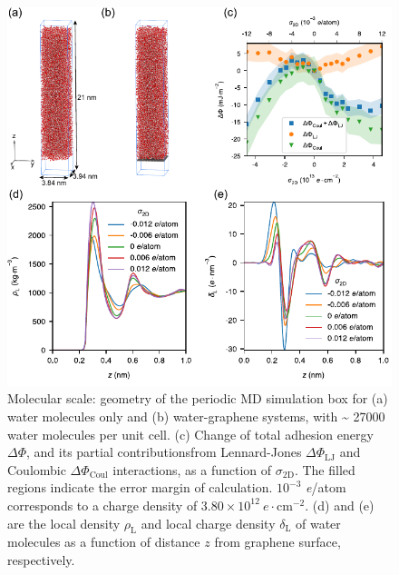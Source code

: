 \documentclass[journal=langd5,manuscript=article,email=true,hyperref=true,keywords=true]{achemso}
\begin{document}
\begin{figure}[htbp]
\centering
\includegraphics[width=0.9\linewidth]{../img/fig-pot-dens.pdf}
\caption{\label{fig:MD-res} Molecular scale: geometry of the periodic
  MD simulation box for (a) water molecules only and (b)
  water-graphene systems, with \textasciitilde{} 27000 water molecules
  per unit cell. (c) Change of total adhesion energy \(\Delta\Phi\),
  and its partial contributionsfrom Lennard-Jones
  \(\Delta\Phi_{\mathrm{LJ}}\) and Coulombic
  \(\Delta\Phi_{\mathrm{Coul}}\) interactions, as a function of
  \(\sigma_{\mathrm{2D}}\). The filled regions indicate the error
  margin of calculation. \(10^{-3}\) \textit{e}/atom corresponds to a
  charge density of \(3.80 \times 10^{12}\ e \cdot
  \mathrm{cm}^{-2}\). (d) and (e) are the local density
  \(\rho_{\mathrm{L}}\) and local charge density
  \(\delta_{\mathrm{L}}\) of water molecules as a function of distance
  \(z\) from graphene surface, respectively.}
\end{figure}
\end{document}
